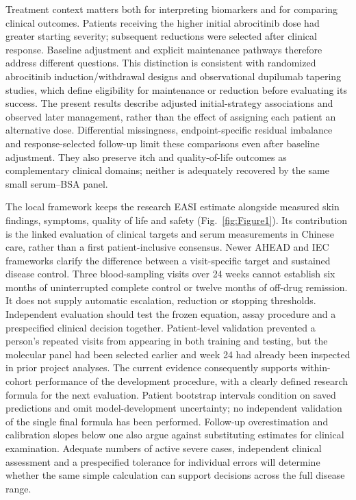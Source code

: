 Treatment context matters both for interpreting biomarkers and for comparing clinical outcomes. Patients receiving the higher initial abrocitinib dose had greater starting severity; subsequent reductions were selected after clinical response. Baseline adjustment and explicit maintenance pathways therefore address different questions. This distinction is consistent with randomized abrocitinib induction/withdrawal designs and observational dupilumab tapering studies, which define eligibility for maintenance or reduction before evaluating its success.\citep{blauvelt2022regimen,spekhorst2023} The present results describe adjusted initial-strategy associations and observed later management, rather than the effect of assigning each patient an alternative dose. Differential missingness, endpoint-specific residual imbalance and response-selected follow-up limit these comparisons even after baseline adjustment. They also preserve itch and quality-of-life outcomes as complementary clinical domains; neither is adequately recovered by the same small serum--BSA panel.

The local framework keeps the research EASI estimate alongside measured skin findings, symptoms, quality of life and safety (Fig.~\ref{fig:Figure1}). Its contribution is the linked evaluation of clinical targets and serum measurements in Chinese care, rather than a first patient-inclusive consensus. Newer AHEAD and IEC frameworks clarify the difference between a visit-specific target and sustained disease control.\citep{silverberg2024ahead,merola2026iec} Three blood-sampling visits over 24 weeks cannot establish six months of uninterrupted complete control or twelve months of off-drug remission. It does not supply automatic escalation, reduction or stopping thresholds. Independent evaluation should test the frozen equation, assay procedure and a prespecified clinical decision together. Patient-level validation prevented a person's repeated visits from appearing in both training and testing, but the molecular panel had been selected earlier and week 24 had already been inspected in prior project analyses. The current evidence consequently supports within-cohort performance of the development procedure, with a clearly defined research formula for the next evaluation. Patient bootstrap intervals condition on saved predictions and omit model-development uncertainty; no independent validation of the single final formula has been performed. Follow-up overestimation and calibration slopes below one also argue against substituting estimates for clinical examination. Adequate numbers of active severe cases, independent clinical assessment and a prespecified tolerance for individual errors will determine whether the same simple calculation can support decisions across the full disease range.
